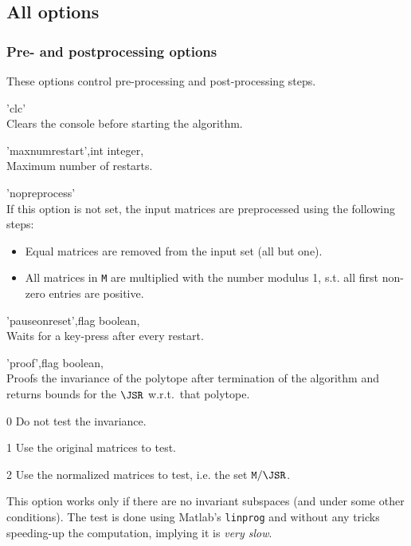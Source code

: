 \subsection{All options}\label{tjsr_alloptions}
\subsubsection{Pre- and postprocessing options} These options control pre-processing and post-processing steps.
\begin{param}
\item['clc'] \\Clears the console before starting the algorithm.

\item['maxnumrestart',int] integer, \\Maximum number of restarts.

\item['nopreprocess'] \label{tjsr_options_nopreprocess}
\\If this option is not set, the input matrices are preprocessed using the following steps:
\begin{itemize}[nosep]
\item Equal matrices are removed from the input set (all but one).
\item All matrices in \texttt{M} are multiplied with the number modulus 1, s.t. all first non-zero entries are positive.
\end{itemize}

\item['pauseonreset',flag] boolean, \\Waits for a key-press after every restart.

\item['proof',flag] boolean, \\Proofs the invariance of the polytope after termination of the algorithm and returns bounds for the $\JSR$ w.r.t.\ that polytope. 
\begin{param}
\item[0] Do not test the invariance.
\item[1] Use the original matrices to test.
\item[2] Use the normalized matrices to test, i.e. the set $\texttt{M}/\JSR$.
\end{param}
This option works only if there are no invariant subspaces (and under some other conditions).
The test is done using Matlab's \texttt{linprog} and without any tricks speeding-up the computation, implying it is \emph{very slow}.


\end{param}

